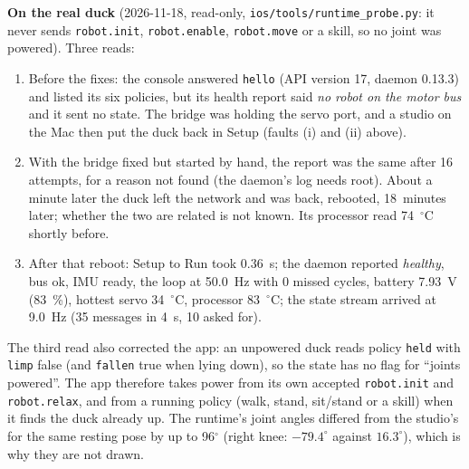 \documentclass[11pt]{article}
\begin{document}
\textbf{On the real duck} (2026-11-18, read-only, \texttt{ios/tools/runtime\_probe.py}: it never sends
\texttt{robot.init}, \texttt{robot.enable}, \texttt{robot.move} or a skill, so no joint was powered). Three reads:
\begin{enumerate}\itemsep0pt
\item Before the fixes: the console answered \texttt{hello} (API version 17, daemon 0.13.3) and listed its six
policies, but its health report said \emph{no robot on the motor bus} and it sent no state. The bridge was holding
the servo port, and a studio on the Mac then put the duck back in Setup (faults (i) and (ii) above).
\item With the bridge fixed but started by hand, the report was the same after 16 attempts, for a reason not
found (the daemon's log needs root). About a minute later the duck left the network and was back, rebooted,
18~minutes later; whether the two are related is not known. Its processor read 74~$^\circ$C shortly before.
\item After that reboot: Setup to Run took 0.36~s; the daemon reported \emph{healthy}, bus ok, IMU ready, the
loop at 50.0~Hz with 0 missed cycles, battery 7.93~V (83~\%), hottest servo 34~$^\circ$C, processor
83~$^\circ$C; the state stream arrived at 9.0~Hz (35 messages in 4~s, 10 asked for).
\end{enumerate}
The third read also corrected the app: an unpowered duck reads policy \texttt{held} with \texttt{limp} false
(and \texttt{fallen} true when lying down), so the state has no flag for ``joints powered''. The app therefore
takes power from its own accepted \texttt{robot.init} and \texttt{robot.relax}, and from a running policy
(walk, stand, sit/stand or a skill) when it finds the duck already up. The runtime's joint angles differed from
the studio's for the same resting pose by up to 96$^\circ$ (right knee: $-79.4^\circ$ against $16.3^\circ$), which
is why they are not drawn.
\end{document}
